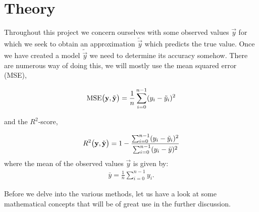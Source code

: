 \section{Theory}\label{sec:theroy}



Throughout this project we concern ourselves with some observed values $\vec{y}$ for which we seek to obtain an approximation $\tilde{\vec{y}}$ which predicts the true value. Once we have created a model $\tilde{\vec{y}}$ we need to determine its accuracy somehow. There are numerous way of doing this, we will mostly use the mean squared error (MSE),


\begin{align}\label{eq:MSE}
    \text{MSE}\big(\mathbf{y}, \tilde{\mathbf{y}}\big)= \frac{1}{n}\sum_{i=0}^{n-1} (y_i - \tilde{y}_i)^2
\end{align}

and the $R^2$-score,

\begin{align}\label{eq:R2}
    R^2\big(\mathbf{y}, \tilde{\mathbf{y}}\big) = 1 - \frac{\sum_{i=0}^{n-1}(y_i-\tilde{y}_i)^2}{\sum_{i=0}^{n-1}(y_i-\bar{y})^2}
\end{align}
where the mean of the observed values $\vec{y}$ is given by:
\begin{align*}
    \bar{y} = \frac{1}{n}\sum_{i=0}^{n-1} y_i.
\end{align*}


Before we delve into the various methods, let us have a look at some mathematical concepts that will be of great use in the further discussion. 

